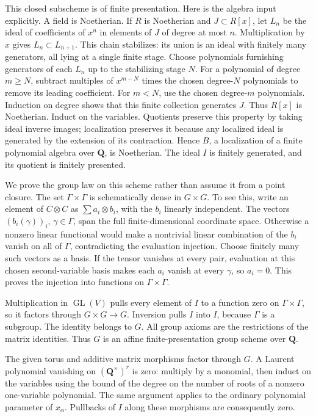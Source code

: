 \documentclass[11pt,a4paper,openany]{report}
\begin{document}
This closed subscheme is of finite presentation. Here is the algebra input explicitly. A field is Noetherian. If \(R\) is Noetherian and \(J\subset R[x]\), let \(L_n\) be the ideal of coefficients of \(x^n\) in elements of \(J\) of degree at most \(n\). Multiplication by \(x\) gives \(L_n\subset L_{n+1}\). This chain stabilizes: its union is an ideal with finitely many generators, all lying at a single finite stage. Choose polynomials furnishing generators of each \(L_n\) up to the stabilizing stage \(N\). For a polynomial of degree \(m\ge N\), subtract multiples of \(x^{m-N}\) times the chosen degree-\(N\) polynomials to remove its leading coefficient. For \(m<N\), use the chosen degree-\(m\) polynomials. Induction on degree shows that this finite collection generates \(J\). Thus \(R[x]\) is Noetherian. Induct on the variables. Quotients preserve this property by taking ideal inverse images; localization preserves it because any localized ideal is generated by the extension of its contraction. Hence \(B\), a localization of a finite polynomial algebra over \(\mathbf Q\), is Noetherian. The ideal \(I\) is finitely generated, and its quotient is finitely presented.

We prove the group law on this scheme rather than assume it from a point closure. The set \(\Gamma\times\Gamma\) is schematically dense in \(G\times G\). To see this, write an element of \(C\otimes C\) as \(\sum a_i\otimes b_i\), with the \(b_i\) linearly independent. The vectors \((b_i(\gamma))_i\), \(\gamma\in\Gamma\), span the full finite-dimensional coordinate space. Otherwise a nonzero linear functional would make a nontrivial linear combination of the \(b_i\) vanish on all of \(\Gamma\), contradicting the evaluation injection. Choose finitely many such vectors as a basis. If the tensor vanishes at every pair, evaluation at this chosen second-variable basis makes each \(a_i\) vanish at every \(\gamma\), so \(a_i=0\). This proves the injection into functions on \(\Gamma\times\Gamma\).

Multiplication in \(\operatorname{GL}(V)\) pulls every element of \(I\) to a function zero on \(\Gamma\times\Gamma\), so it factors through \(G\times G\to G\). Inversion pulls \(I\) into \(I\), because \(\Gamma\) is a subgroup. The identity belongs to \(G\). All group axioms are the restrictions of the matrix identities. Thus \(G\) is an affine finite-presentation group scheme over \(\mathbf Q\).

The given torus and additive matrix morphisms factor through \(G\). A Laurent polynomial vanishing on \((\mathbf Q^\times)^r\) is zero: multiply by a monomial, then induct on the variables using the bound of the degree on the number of roots of a nonzero one-variable polynomial. The same argument applies to the ordinary polynomial parameter of \(x_\alpha\). Pullbacks of \(I\) along these morphisms are consequently zero.
\end{document}
